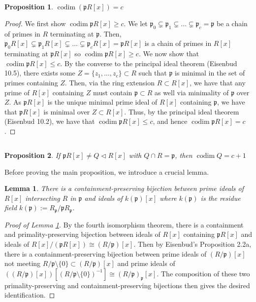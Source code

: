 \documentclass[Letter,12pt]{article}
\newcommand{\pfr}{\mathfrak{p}}
\newcommand{\<}{\left\langle}
\renewcommand{\>}{\right\rangle}
\DeclareMathOperator{\codim}{codim}
\newenvironment{subproof}[1][\proofname]{%
	\renewcommand{\qedsymbol}{$\blacksquare$}%
	\begin{proof}[#1]%
	}{%
	\end{proof}%
}
\newcommand{\prt}[1]{\setcounter{subsection}{#1-1}\subsection{}}
\newtheorem{lemma}[theorem]{Lemma}
\newtheorem*{prop*}{Proposition}
\theoremstyle{definition}
\begin{document}
\prt{1}
	\begin{prop*}
		$\codim (\pfr R[x])=c$
	\end{prop*}
\begin{proof}
	We first show $\codim \pfr R[x]\geq c$. We let $\pfr_0\subsetneq \pfr_1\subsetneq \dots\subsetneq \pfr_c=\pfr$ be a chain of primes in $R$ terminating at $\pfr$. Then, $\pfr_0R[x]\subsetneq \pfr_1R[x]\subsetneq\dots\subsetneq \pfr_cR[x]=\pfr R[x]$ is a chain of primes in $R[x]$ terminating at $\pfr R[x]$ so $\codim \pfr R[x]\geq c$. We now show that $\codim \pfr R[x]\leq c$. By the converse to the principal ideal theorem (Eisenbud 10.5), there exists some $Z=\{z_1,\dots,z_c\}\subset R$ such that $\pfr$ is minimal in the set of primes containing $Z$. Then, via the ring extension $R\subset R[x]$, we have that any prime of $R[x]$ containing $Z$ must contain $\pfr\subset R$ as well via minimality of $\pfr$ over $Z$. As $\pfr R[x]$ is the unique minimal prime ideal of $R[x]$ containing $\pfr$, we have that $\pfr R[x]$ is minimal over $Z\subset R[x]$. Thus, by the principal ideal theorem (Eisenbud 10.2), we have that $\codim \pfr R[x]\leq c$, and hence $\codim \pfr R[x]=c$. 
\end{proof}
\prt{2}
\begin{prop*}
	If $\pfr R[x]\neq Q\triangleleft R[x]$ with $Q\cap R=\pfr$, then $\codim Q=c+1$
\end{prop*}
Before proving the main proposition, we introduce a crucial lemma.
\begin{lemma}\label{6b:keylem}
There is a containment-preserving bijection between prime ideals of $R[x]$ intersecting $R$ in $\pfr$ and ideals of $k(\pfr)[x]$ where $k(\pfr)$ is the residue field $k(\pfr):=R_\pfr/\pfr R_\pfr$. \end{lemma}
\begin{subproof}[Proof of Lemma \ref{6b:keylem}]
By the fourth isomorphism theorem, there is a containment and primality-preserving bijection between ideals of $R[x]$ containing $\pfr R[x]$ and ideals of $R[x]/(\pfr R[x])\cong (R/\pfr)[x]$. Then by Eisenbud's Proposition 2.2a, there is a containment-preserving bijection between prime ideals of $(R/\pfr)[x]$ not meeting $R/\pfr\setminus\{0\}\subset (R/\pfr)[x]$ and prime ideals of $\left((R/\pfr)[x]\right)[(R/\pfr\setminus\{0\})^{-1}]\cong (R/\pfr)_\pfr[x]$. The composition of these two primality-preserving and containment-preserving bijections then gives the desired identification.
\end{subproof}
\end{document}
